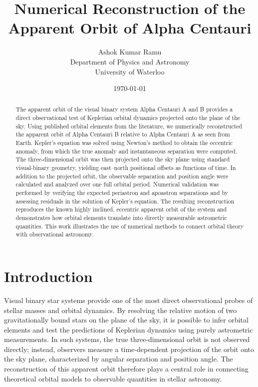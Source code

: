 \documentclass[11pt]{article}
\begin{document}
\title{Numerical Reconstruction of the Apparent Orbit of Alpha Centauri}
\author{Ashok Kumar Ramu \\ Department of Physics and Astronomy \\ University of Waterloo}
\date{\today}

\maketitle

\begin{abstract}
The apparent orbit of the visual binary system Alpha Centauri A and B provides a direct observational test of Keplerian orbital dynamics projected onto the plane of the sky. Using published orbital elements from the literature, we numerically reconstructed the apparent orbit of Alpha Centauri B relative to Alpha Centauri A as seen from Earth. Kepler’s equation was solved using Newton’s method to obtain the eccentric anomaly, from which the true anomaly and instantaneous separation were computed. The three-dimensional orbit was then projected onto the sky plane using standard visual-binary geometry, yielding east–north positional offsets as functions of time. In addition to the projected orbit, the observable separation and position angle were calculated and analyzed over one full orbital period. Numerical validation was performed by verifying the expected periastron and apoastron separations and by assessing residuals in the solution of Kepler’s equation. The resulting reconstruction reproduces the known highly inclined, eccentric apparent orbit of the system and demonstrates how orbital elements translate into directly measurable astrometric quantities. This work illustrates the use of numerical methods to connect orbital theory with observational astronomy.
\end{abstract}

\section{Introduction}
Visual binary star systems provide one of the most direct observational probes of stellar masses and orbital dynamics. By resolving the relative motion of two gravitationally bound stars on the plane of the sky, it is possible to infer orbital elements and test the predictions of Keplerian dynamics using purely astrometric measurements. In such systems, the true three-dimensional orbit is not observed directly; instead, observers measure a time-dependent projection of the orbit onto the sky plane, characterized by angular separation and position angle. The reconstruction of this apparent orbit therefore plays a central role in connecting theoretical orbital models to observable quantities in stellar astronomy.
\end{document}
